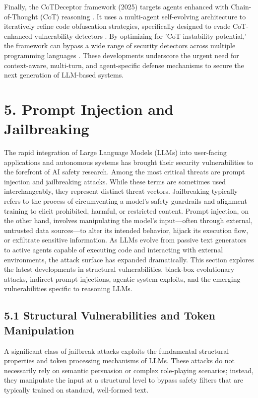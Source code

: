 \documentclass[11pt,a4paper]{article}
\begin{document}
Finally, the CoTDeceptor framework (2025) targets agents enhanced with Chain-of-Thought (CoT) reasoning \cite{Li_2025_CoT}. It uses a multi-agent self-evolving architecture to iteratively refine code obfuscation strategies, specifically designed to evade CoT-enhanced vulnerability detectors \cite{Li_2025_CoT}. By optimizing for 'CoT instability potential,' the framework can bypass a wide range of security detectors across multiple programming languages \cite{Li_2025_CoT}. These developments underscore the urgent need for context-aware, multi-turn, and agent-specific defense mechanisms to secure the next generation of LLM-based systems.

\section{5. Prompt Injection and Jailbreaking}

The rapid integration of Large Language Models (LLMs) into user-facing applications and autonomous systems has brought their security vulnerabilities to the forefront of AI safety research. Among the most critical threats are prompt injection and jailbreaking attacks. While these terms are sometimes used interchangeably, they represent distinct threat vectors. Jailbreaking typically refers to the process of circumventing a model's safety guardrails and alignment training to elicit prohibited, harmful, or restricted content. Prompt injection, on the other hand, involves manipulating the model's input---often through external, untrusted data sources---to alter its intended behavior, hijack its execution flow, or exfiltrate sensitive information. As LLMs evolve from passive text generators to active agents capable of executing code and interacting with external environments, the attack surface has expanded dramatically. This section explores the latest developments in structural vulnerabilities, black-box evolutionary attacks, indirect prompt injections, agentic system exploits, and the emerging vulnerabilities specific to reasoning LLMs.

\subsection{5.1 Structural Vulnerabilities and Token Manipulation}
A significant class of jailbreak attacks exploits the fundamental structural properties and token processing mechanisms of LLMs. These attacks do not necessarily rely on semantic persuasion or complex role-playing scenarios; instead, they manipulate the input at a structural level to bypass safety filters that are typically trained on standard, well-formed text.
\end{document}
